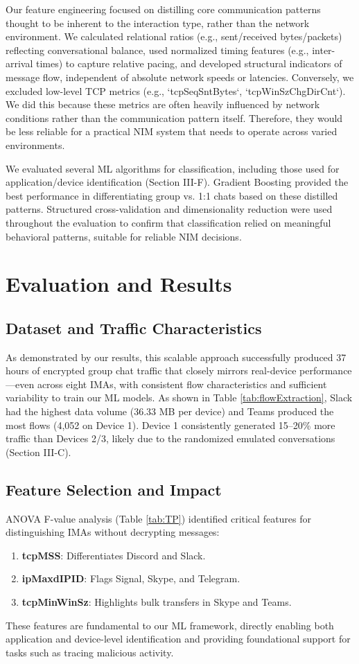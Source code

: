 \documentclass[conference]{IEEEtran}
\begin{document}
Our feature engineering focused on distilling core communication patterns thought to be inherent to the interaction type, rather than the network environment. We calculated relational ratios (e.g., sent/received bytes/packets) reflecting conversational balance, used normalized timing features (e.g., inter-arrival times) to capture relative pacing, and developed structural indicators of message flow, independent of absolute network speeds or latencies. Conversely, we excluded low-level TCP metrics (e.g., `tcpSeqSntBytes`, `tcpWinSzChgDirCnt`). We did this because these metrics are often heavily influenced by network conditions rather than the communication pattern itself. Therefore, they would be less reliable for a practical NIM system that needs to operate across varied environments.

We evaluated several ML algorithms for classification, including those used for application/device identification (Section III-F). Gradient Boosting provided the best performance in differentiating group vs. 1:1 chats based on these distilled patterns. Structured cross-validation and dimensionality reduction were used throughout the evaluation to confirm that classification relied on meaningful behavioral patterns, suitable for reliable NIM decisions.

\section{Evaluation and Results}
\subsection{Dataset and Traffic Characteristics}
As demonstrated by our results, this scalable approach successfully produced 37 hours of encrypted group chat traffic that closely mirrors real-device performance—even across eight IMAs, with consistent flow characteristics and sufficient variability to train our ML models. As shown in Table \ref{tab:flowExtraction}, Slack had the highest data volume (36.33 MB per device) and Teams produced the most flows (4,052 on Device 1). Device 1 consistently generated 15–20\% more traffic than Devices 2/3, likely due to the randomized emulated conversations (Section III-C).


\subsection{Feature Selection and Impact}
ANOVA F-value analysis (Table \ref{tab:TP}) identified critical features for distinguishing IMAs without decrypting messages: \begin{enumerate} 
    \item \textbf{tcpMSS}: Differentiates Discord and Slack. 
    \item \textbf{ipMaxdIPID}: Flags Signal, Skype, and Telegram. 
    \item \textbf{tcpMinWinSz}: Highlights bulk transfers in Skype and Teams. 
\end{enumerate} 
These features are fundamental to our ML framework, directly enabling both application and device-level identification and providing foundational support for tasks such as tracing malicious activity.
\end{document}
